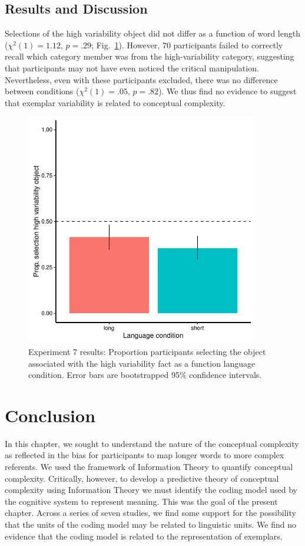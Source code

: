 \subsection{Results and Discussion}

Selections of the high variability object did not differ as a function of word length (${\chi}^2$$(1) = 1.12$, $p = .29$; Fig.\ \ref{fig:var_plot}). However, 70 participants failed to correctly recall which category member was from the high-variability category, suggesting that participants may not have even noticed the critical manipulation. Nevertheless, even with these participants excluded, there was no difference between conditions (${\chi}^2$$(1) = .05$, $p = .82$). We thus find no evidence to suggest that exemplar variability is related to conceptual complexity.

  \begin{figure}[t!]
 \begin{center}
  \includegraphics[width=4in]{figs/var_results.pdf}
  \caption{\label{fig:var_plot} Experiment 7 results: Proportion participants selecting the object associated with the high variability fact as a function language condition.  Error bars are bootstrapped 95\% confidence intervals.}
 \end{center}
\end{figure}

\section{Conclusion}
In this chapter, we sought to understand the nature of the conceptual complexity as reflected in the bias for participants to map longer words to more complex  referents. We used the framework of  Information Theory to quantify conceptual complexity. Critically, however, to develop a predictive theory of conceptual complexity using Information Theory we must identify the  coding model used by the cognitive system to represent meaning. This was the goal of the present chapter.  Across a series of seven studies, we find some support for the possibility that the units of the coding model may be related to linguistic units. We find no evidence that the coding model is related to the representation of exemplars. 

